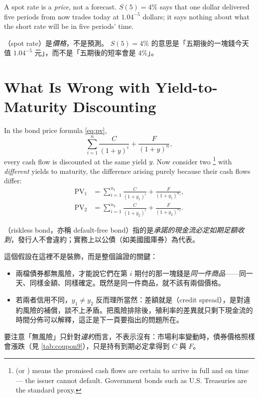 \suppstart
\begin{intuition}
	A spot rate is a \emph{price}, not a forecast.
	$S(5)=4\%$ says that one dollar delivered five periods from now trades today at $1.04^{-5}$ dollars; it says nothing about what the short rate will be in five periods' time.

	（spot rate）是\emph{價格}，不是預測。
	$S(5)=4\%$ 的意思是「五期後的一塊錢今天值 $1.04^{-5}$ 元」，而不是「五期後的短率會是 $4\%$」。
\end{intuition}
\suppend

\section{What Is Wrong with Yield-to-Maturity Discounting}
\label{sec:ytm-problem}


In the bond price formula \eqref{eq:pv},
\[
	\sum_{i=1}^{n}\frac{C}{(1+y)^{i}} + \frac{F}{(1+y)^{n}} ,
\]
every cash flow is discounted at the same yield $y$.
Now consider two \footnote{ (or ) means the promised cash flows are certain to arrive in full and on time --- the issuer cannot default. Government bonds such as U.S. Treasuries are the standard proxy.} with \emph{different} yields to maturity, the difference arising purely because their cash flows differ:
\begin{align}
	\mathrm{PV}_{1} & = \sum_{i=1}^{n_{1}}\frac{C}{(1+y_{1})^{i}} + \frac{F}{(1+y_{1})^{n_{1}}} , \label{eq:pv1} \\
	\mathrm{PV}_{2} & = \sum_{i=1}^{n_{2}}\frac{C}{(1+y_{2})^{i}} + \frac{F}{(1+y_{2})^{n_{2}}} . \label{eq:pv2}
\end{align}

\suppstart
\begin{note}
	（riskless bond，亦稱 default-free bond）指的是\emph{承諾的現金流必定如期足額收到}，發行人不會違約；實務上以公債（如美國國庫券）為代表。

	這個假設在這裡不是裝飾，而是整個論證的關鍵：
	\begin{itemize}[itemsep=0.3em]
		\item 兩檔債券都無風險，才能說它們在第 $i$ 期付的那一塊錢是\emph{同一件商品}——同一天、同樣金額、同樣確定。既然是同一件商品，就不該有兩個價格。
		\item 若兩者信用不同，$y_{1} \neq y_{2}$ 反而理所當然：差額就是（credit spread），是對違約風險的補償，談不上矛盾。把風險排除後，殖利率的差異就只剩下現金流的時間分佈可以解釋，這正是下一頁要指出的問題所在。
	\end{itemize}

	要注意「無風險」只針對\emph{違約}而言，不表示沒有：市場利率變動時，債券價格照樣會漲跌（見 \autoref{tab:coupon9}），只是持有到期必定拿得到 $C$ 與 $F$。
\end{note}
\suppend

